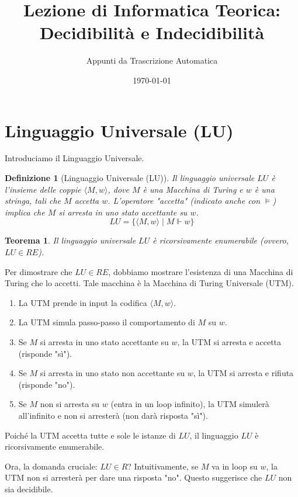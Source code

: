 \documentclass[a4paper]{article}
\title{Lezione di Informatica Teorica: Decidibilità e Indecidibilità}
\author{Appunti da Trascrizione Automatica}
\date{\today}
\makeatletter
\newtheorem{theorem}{Teorema}[section] %
\newtheorem{definition}{Definizione}[section] %
\renewenvironment{proof}[1][\proofname]{\par
  \pushQED{\qed}%
  \normalfont \topsep6\p@\@plus6\p@\relax
  \trivlist
  \item[\hskip\labelsep
        \bfseries
    #1\@addpunct{.}]\ignorespaces
}{%
  \popQED\endtrivlist\@endpefalse
}
\makeatother
\begin{document}
\maketitle
\tableofcontents
\newpage

\section{Linguaggio Universale (LU)}

Introduciamo il Linguaggio Universale.
\begin{definition}[Linguaggio Universale (LU)]
Il linguaggio universale $LU$ è l'insieme delle coppie $\langle M, w \rangle$, dove $M$ è una Macchina di Turing e $w$ è una stringa, tali che $M$ accetta $w$. L'operatore "accetta" (indicato anche con $\models$) implica che $M$ si arresta in uno stato accettante su $w$.
\[ LU = \{ \langle M, w \rangle \mid M \Vdash w \} \]
\end{definition}

\begin{theorem}
Il linguaggio universale $LU$ è ricorsivamente enumerabile (ovvero, $LU \in RE$).
\end{theorem}
\begin{proof}
Per dimostrare che $LU \in RE$, dobbiamo mostrare l'esistenza di una Macchina di Turing che lo accetti. Tale macchina è la Macchina di Turing Universale (UTM).
\begin{enumerate}
    \item La UTM prende in input la codifica $\langle M, w \rangle$.
    \item La UTM simula passo-passo il comportamento di $M$ su $w$.
    \item Se $M$ si arresta in uno stato accettante su $w$, la UTM si arresta e accetta (risponde "sì").
    \item Se $M$ si arresta in uno stato non accettante su $w$, la UTM si arresta e rifiuta (risponde "no").
    \item Se $M$ non si arresta su $w$ (entra in un loop infinito), la UTM simulerà all'infinito e non si arresterà (non darà risposta "sì").
\end{enumerate}
Poiché la UTM accetta tutte e sole le istanze di $LU$, il linguaggio $LU$ è ricorsivamente enumerabile.
\end{proof}

Ora, la domanda cruciale: $LU \in R$? Intuitivamente, se $M$ va in loop su $w$, la UTM non si arresterà per dare una risposta "no". Questo suggerisce che $LU$ non sia decidibile.
\end{document}
